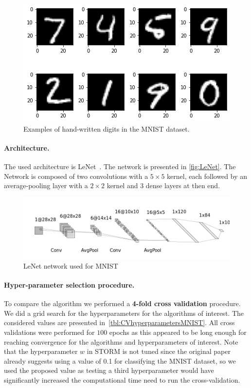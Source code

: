 \documentclass[a4paper,11pt,oneside]{report}
\begin{document}
\begin{figure}
    \centering
    \includegraphics[scale=0.5]{figures/MNIST_example.png}
    \caption{Examples of hand-written digits in the MNIST dataset.}
    \label{fig:MNIST_examples}
\end{figure}

\paragraph{Architecture.}
The used architecture is LeNet~\citep{leNet}. The network is presented in \autoref{fig:LeNet}. The Network is composed of two convolutions with a $5 \times 5$ kernel, each followed by an average-pooling layer with a $2 \times 2$ kernel and 3 dense layers at then end. 


\begin{figure}
    \centering
    \includegraphics[width=\columnwidth]{midterm presentation/images/LeNet.png}
    \caption{LeNet network used for MNIST}
    \label{fig:LeNet}
\end{figure}


\paragraph{Hyper-parameter selection procedure.}
To compare the algorithm we performed a \textbf{4-fold cross validation} procedure. We did a grid search for the hyperparameters for the algorithms of interest. The considered values are presented in~\autoref{tbl:CVhyperparametersMNIST}. All cross validations were performed for $100$ epochs as this appeared to be long enough for reaching convergence for the algorithms and hyperparameters of interest.  
Note that the hyperparameter $w$ in STORM is not tuned since the original paper already suggests using a value of 0.1 for classifying the MNIST dataset, so we used the proposed value as testing a third hyperparameter would have significantly increased the computational time need to run the cross-validation.
\end{document}
